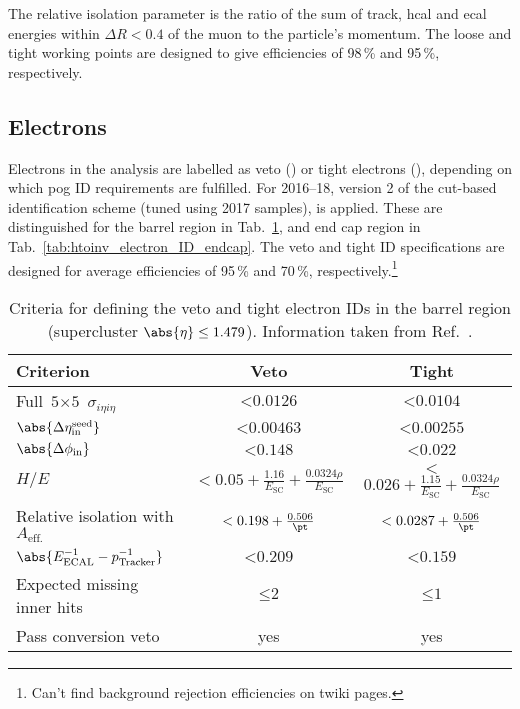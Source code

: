 The relative isolation parameter is the ratio of the sum of track, \acrshort{hcal} and \acrshort{ecal} energies within $\Delta R < \text{0.4}$ of the muon to the particle's momentum. The loose and tight working points are designed to give efficiencies of 98\,\% and 95\,\%, respectively.




\subsection{Electrons}
\label{subsec:objects_electrons}

Electrons in the analysis are labelled as veto (\vetoEle) or tight electrons (\tightEle), depending on which \acrshort{pog} ID requirements are fulfilled. For 2016--18, version 2 of the cut-based identification scheme (tuned using 2017 samples), is applied. These are distinguished for the barrel region in Tab.~\ref{tab:htoinv_electron_ID_barrel}, and end cap region in Tab.~\ref{tab:htoinv_electron_ID_endcap}. The veto and tight ID specifications are designed for average efficiencies of 95\,\% and 70\,\%, respectively.\footnote{Can't find background rejection efficiencies on twiki pages.}

\begin{table}[htbp]
    \centering
    \begin{tabular}{lcc}
    \toprule
    Criterion & Veto & Tight \\\midrule
    Full $\text{5} \times \text{5}$ $\sigma_{i\eta i\eta}$ & $< \text{0.0126}$ & $< \text{0.0104}$    \\
    $\abs{\Delta\eta_{\mathrm{in}}^{\mathrm{seed}}}$ & $< \text{0.00463}$ & $< \text{0.00255}$ \\
    $\abs{\Delta\phi_{\mathrm{in}}}$ & $< \text{0.148}$ & $< \text{0.022}$ \\
    $H/E$ & $<\text{0.05} + \frac{\text{1.16}}{E_{\mathrm{SC}}} + \frac{\text{0.0324}\rho}{E_{\mathrm{SC}}}$ & $<$ $\text{0.026} + \frac{\text{1.15}}{E_{\mathrm{SC}}} + \frac{\text{0.0324}\rho}{E_{\mathrm{SC}}}$ \\
    Relative isolation with $A_{\mathrm{eff.}}$ & $< \text{0.198} + \frac{\text{0.506}}{\pt}$ & $< \text{0.0287} + \frac{\text{0.506}}{\pt}$\\
    $\abs{E^{-1}_{\mathrm{ECAL}} - p^{-1}_{\mathrm{Tracker}}}$ & $< \text{0.209}$ & $< \text{0.159}$\\
    Expected missing inner hits & $\leq \text{2}$ & $\leq \text{1}$\\
    Pass conversion veto & yes & yes \\
    \bottomrule
    \end{tabular}
    \caption[Criteria for defining the veto and tight electron IDs in the barrel region (supercluster $\abs{\eta} \leq \text{1.479}$)]{Criteria for defining the veto and tight electron IDs in the barrel region (supercluster $\abs{\eta} \leq \text{1.479}$). Information taken from Ref.~.}
    \label{tab:htoinv_electron_ID_barrel}
\end{table}

